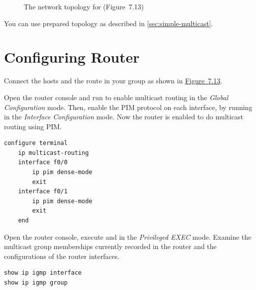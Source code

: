 \documentclass{../UTNetLab}
\begin{document}
\begin{figure}[H]
    \centering
    \caption{The network topology for  (Figure~7.13)}
    \label{fig:7.13}
\end{figure}

You can use prepared topology as described in \autoref{sec:simple-multicast}.

\section{Configuring Router}
\label{sec:config-router}
Connect the hosts and the route in your group as shown in \hyperref[fig:7.13]{Figure~7.13}.

Open the router console and run  to enable multicast routing in the \textit{Global Configuration} mode.
Then, enable the PIM protocol on each interface, by running  in the \textit{Interface Configuration} mode.
Now the router is enabled to do multicast routing using PIM.

\begin{lstlisting}[language=cisco]
configure terminal
    ip multicast-routing
    interface f0/0
        ip pim dense-mode
        exit
    interface f0/1
        ip pim dense-mode
        exit
    end
\end{lstlisting}

Open the router console, execute  and  in the \textit{Privileged EXEC} mode.
Examine the multicast group memberships currently recorded in the router and the configurations of the router interfaces.

\begin{lstlisting}[language=cisco]
show ip igmp interface
show ip igmp group
\end{lstlisting}
\end{document}
